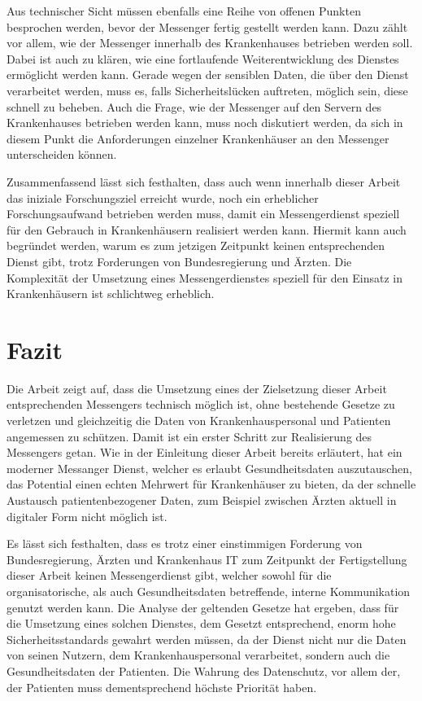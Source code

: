 Aus technischer Sicht müssen ebenfalls eine Reihe von offenen Punkten besprochen werden, bevor der Messenger fertig gestellt werden kann.
Dazu zählt vor allem, wie der Messenger innerhalb des Krankenhauses betrieben werden soll. Dabei ist auch zu klären, wie eine fortlaufende Weiterentwicklung des Dienstes ermöglicht werden kann. Gerade wegen der sensiblen Daten, die über den Dienst verarbeitet werden, muss es, falls Sicherheitslücken auftreten, möglich sein, diese schnell zu beheben. Auch die Frage, wie der Messenger auf den Servern des Krankenhauses betrieben werden kann, muss noch diskutiert werden, da sich in diesem Punkt die Anforderungen einzelner Krankenhäuser an den Messenger unterscheiden können.

Zusammenfassend lässt sich festhalten, dass auch wenn innerhalb dieser Arbeit das iniziale Forschungsziel erreicht wurde, noch ein erheblicher Forschungsaufwand betrieben werden muss, damit ein Messengerdienst speziell für den Gebrauch in Krankenhäusern realisiert werden kann. Hiermit kann auch begründet werden, warum es zum jetzigen Zeitpunkt keinen entsprechenden Dienst gibt, trotz Forderungen von Bundesregierung und Ärzten. Die Komplexität der Umsetzung eines Messengerdienstes speziell für den Einsatz in Krankenhäusern ist schlichtweg erheblich.

\section{Fazit}\label{chapter:fazit}
Die Arbeit zeigt auf, dass die Umsetzung eines der Zielsetzung dieser Arbeit entsprechenden Messengers technisch möglich ist, ohne bestehende Gesetze zu verletzen und gleichzeitig die Daten von Krankenhauspersonal und Patienten angemessen zu schützen.
Damit ist ein erster Schritt zur Realisierung des Messengers getan. Wie in der Einleitung dieser Arbeit bereits erläutert, hat ein moderner Messanger Dienst, welcher es erlaubt Gesundheitsdaten auszutauschen, das Potential einen echten Mehrwert für Krankenhäuser zu bieten, da der schnelle Austausch patientenbezogener Daten, zum Beispiel zwischen Ärzten aktuell in digitaler Form nicht möglich ist. 

Es lässt sich festhalten, dass es trotz einer einstimmigen Forderung von Bundesregierung, Ärzten und Krankenhaus IT zum Zeitpunkt der Fertigstellung dieser Arbeit keinen Messengerdienst gibt, welcher sowohl für die organisatorische, als auch Gesundheitsdaten betreffende, interne Kommunikation genutzt werden kann. Die Analyse der geltenden Gesetze hat ergeben, dass für die Umsetzung eines solchen Dienstes, dem Gesetzt entsprechend, enorm hohe Sicherheitsstandards gewahrt werden müssen, da der Dienst nicht nur die Daten von seinen Nutzern, dem Krankenhauspersonal verarbeitet, sondern auch die Gesundheitsdaten der Patienten. Die Wahrung des Datenschutz, vor allem der, der Patienten muss dementsprechend höchste Priorität haben. 

